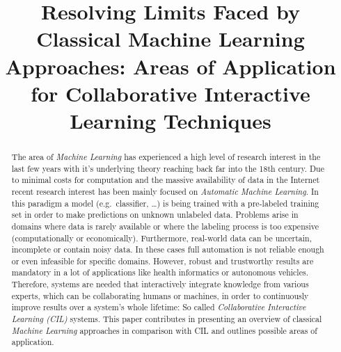 \documentclass[conference]{IEEEtran}
\begin{document}
\title{Resolving Limits Faced by Classical Machine Learning Approaches: Areas of Application for 
Collaborative Interactive Learning Techniques}


\author{
}

\maketitle

\begin{abstract}
The area of \textit{Machine Learning} has experienced a high 
level of research interest in the last few years with it's underlying 
theory reaching back far into the 18th century. Due to minimal 
costs for computation and the massive availability of data in the 
Internet recent research interest has been mainly focused on 
\textit{Automatic Machine Learning}. In this paradigm a model 
(e.g.\ classifier, \dots) is being trained with a pre-labeled training 
set in order to make predictions on unknown unlabeled data. Problems arise 
in domains where data is rarely available or where the labeling process is 
too expensive (computationally or economically). Furthermore, real-world data 
can be uncertain, incomplete or contain noisy data. In these cases 
full automation is not reliable enough or even infeasible for specific 
domains. However, robust and trustworthy results are mandatory in a lot of 
applications like health informatics or autonomous vehicles. 
Therefore, systems are needed that interactively integrate knowledge from 
various experts, which can be collaborating humans or machines, in order 
to continuously improve results over a system's whole lifetime: So called 
\textit{Collaborative Interactive Learning (CIL)} systems.
This paper contributes in presenting an overview of classical \textit{Machine Learning} 
approaches in comparison with CIL and outlines possible areas of application. 
\end{abstract}
\end{document}
